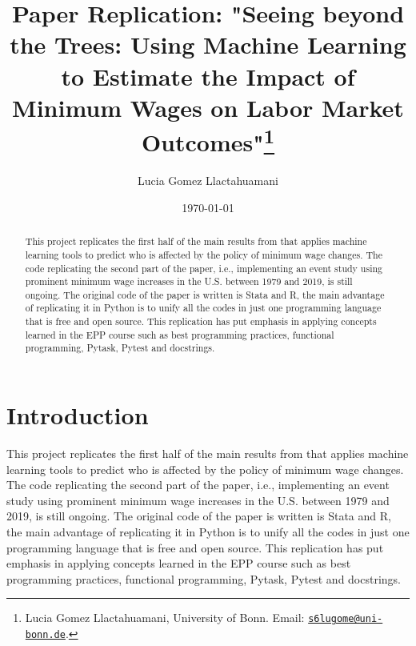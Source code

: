 \documentclass[11pt, a4paper, leqno]{article}
\begin{document}
\title{Paper Replication: "Seeing beyond the Trees: Using Machine Learning to Estimate the Impact of Minimum Wages on Labor Market Outcomes"\thanks{Lucia Gomez Llactahuamani, University of Bonn. Email: \href{mailto:s6lugome@uni-bonn.de}{\nolinkurl{s6lugome@uni-bonn.de}}.}}

\author{Lucia Gomez Llactahuamani}

\date{\today}

\maketitle


\begin{abstract}

This project replicates the first half of the main results from \citet{cengiz2022seeing} 
that applies machine learning tools to predict who is affected by the policy of minimum 
wage changes. The code replicating the second part of the paper, i.e., implementing an event 
study using prominent minimum wage increases in the U.S. between 1979 and 2019, is still ongoing. 
The original code of the paper is written is Stata and R, the main advantage of replicating 
it in Python is to unify all the codes in just one programming language that is free and open source. 
This replication has put emphasis in applying concepts learned in the EPP course such 
as best programming practices, functional programming, Pytask, Pytest and docstrings.
\end{abstract}

\clearpage


\section{Introduction} %
\label{sec:introduction}

This project replicates the first half of the main results from \citet{cengiz2022seeing} that applies machine learning 
tools to predict who is affected by the policy of minimum wage changes. The code replicating the second part 
of the paper, i.e., implementing an event study using prominent minimum wage increases in the U.S. between 1979
and 2019, is still ongoing. The original code of the paper is written is Stata and R, the main advantage of 
replicating it in Python is to unify all the codes in just one programming language that is free and open source. 
This replication has put emphasis in applying concepts learned in the EPP course such as best programming practices,
functional programming, Pytask, Pytest and docstrings.
\end{document}
